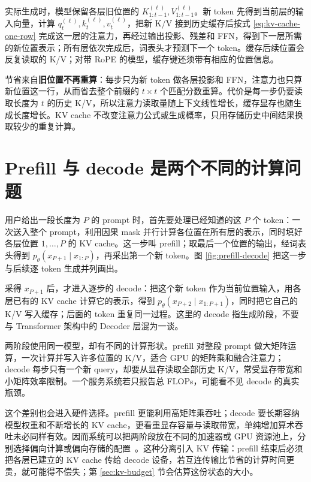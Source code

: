 实际生成时，模型保留各层旧位置的 \(K_{1:t-1}^{(\ell)},V_{1:t-1}^{(\ell)}\)。新 token 先得到当前层的输入向量，计算 \(q_t^{(\ell)},k_t^{(\ell)},v_t^{(\ell)}\)，把新 K/V 接到历史缓存后按式 \eqref{eq:kv-cache-one-row} 完成这一层的注意力，再经过输出投影、残差和 FFN，得到下一层所需的新位置表示；所有层依次完成后，词表头才预测下一个 token。缓存后续位置会反复读取的 K/V；对带 RoPE 的模型，缓存键还须带有相应的位置信息。

节省来自\textbf{旧位置不再重算}：每步只为新 token 做各层投影和 FFN，注意力也只算新位置这一行，从而省去整个前缀的 \(t\times t\) 个匹配分数重算。代价是每一步仍要读取长度为 \(t\) 的历史 K/V，所以注意力读取量随上下文线性增长，缓存显存也随生成长度增长。KV cache 不改变注意力公式或生成概率，只用存储历史中间结果换取较少的重复计算。

\section{Prefill 与 decode 是两个不同的计算问题}
\label{sec:prefill-decode}

用户给出一段长度为 \(P\) 的 prompt 时，首先要处理已经知道的这 \(P\) 个 token：一次送入整个 prompt，利用因果 mask 并行计算各位置在所有层的表示，同时填好各层位置 \(1,\ldots,P\) 的 KV cache。这一步叫 prefill；取最后一个位置的输出，经词表头得到 \(p_\theta(x_{P+1}\mid x_{1:P})\)，再采出第一个新 token。图 \ref{fig:prefill-decode} 把这一步与后续逐 token 生成并列画出。

采得 \(x_{P+1}\) 后，才进入逐步的 decode：把这个新 token 作为当前位置输入，用各层已有的 KV cache 计算它的表示，得到 \(p_\theta(x_{P+2}\mid x_{1:P+1})\)，同时把它自己的 K/V 写入缓存；后面的 token 重复同一过程。这里的 decode 指生成阶段，不要与 Transformer 架构中的 Decoder 层混为一谈。

两阶段使用同一模型，却有不同的计算形状。prefill 对整段 prompt 做大矩阵运算，一次计算并写入许多位置的 K/V，适合 GPU 的矩阵乘和融合注意力；decode 每步只有一个新 query，却要从显存读取全部历史 K/V，常受显存带宽和小矩阵效率限制。一个服务系统若只报告总 FLOPs，可能看不见 decode 的真实瓶颈。

这个差别也会进入硬件选择。prefill 更能利用高矩阵乘吞吐；decode 要长期容纳模型权重和不断增长的 KV cache，更看重显存容量与读取带宽，单纯增加算术吞吐未必同样有效。因而系统可以把两阶段放在不同的加速器或 GPU 资源池上，分别选择偏向计算或偏向存储的配置~\cite{patel2024splitwise}。这种分离引入 KV 传输：prefill 结束后必须把各层已建立的 KV cache 传给 decode 设备，若互连传输比节省的计算时间更贵，就可能得不偿失；第 \ref{sec:kv-budget} 节会估算这份状态的大小。

